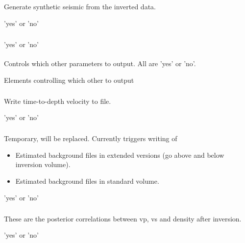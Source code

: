 \subparagraph{}
 \slist
   \item \Description Generate synthetic seismic from the inverted data.
   \item \Argument 'yes' or 'no'
   \item \Default
 \elist

\subparagraph{}
 \slist
   \item \Description
   \item \Argument 'yes' or 'no'
   \item \Default
\elist

\paragraph{}
 \slist
   \item \Description Controls which other parameters to output. All are 'yes' or 'no'.
   \item \Argument Elements controlling which other to output
   \item \Default 
 \elist

\subparagraph{}
 \slist
   \item \Description Write time-to-depth velocity to file.
   \item \Argument 'yes' or 'no'
   \item \Default
 \elist

\subparagraph{}
 \slist
   \item \Description Temporary, will be replaced. Currently triggers writing of
   \begin{itemize}
   \item Estimated background files in extended versions (go above and below inversion volume).
   \item Estimated background files in standard volume.
   \end{itemize}
   \item \Argument 'yes' or 'no'
   \item \Default
\elist

\subparagraph{}
 \slist
   \item \Description These are the posterior correlations between vp, vs and density after inversion.
   \item \Argument 'yes' or 'no'
   \item \Default
\elist



